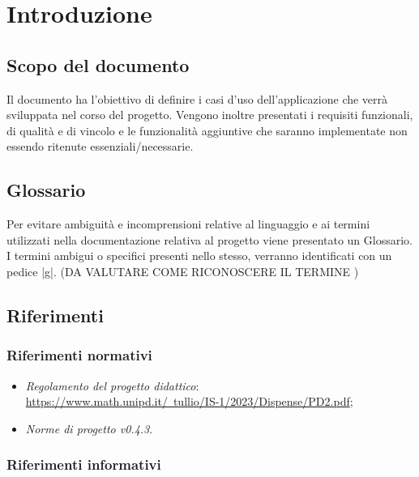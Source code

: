 \documentclass[10pt, a4paper]{article}
\title{\titolo}
\author{SWEetCode}
\begin{document}



\newpage

\tableofcontents
\newpage

\section{Introduzione}
\subsection{Scopo del documento}
Il documento ha l'obiettivo di definire i casi d'uso dell'applicazione che verrà sviluppata nel corso del progetto. Vengono inoltre presentati i requisiti funzionali, di qualità e di vincolo e le funzionalità aggiuntive che saranno implementate non essendo ritenute essenziali/necessarie.
\\
\subsection{Glossario}
Per evitare ambiguità e incomprensioni relative al linguaggio e ai termini utilizzati nella documentazione relativa al progetto viene presentato un Glossario.
I termini ambigui o specifici presenti nello stesso, verranno identificati con un pedice |g|. (DA VALUTARE COME RICONOSCERE IL TERMINE )
\\
\subsection{Riferimenti}
   \subsubsection{Riferimenti normativi}
   \begin{itemize}
    \item \textit{Regolamento del progetto didattico}: \\
    \href{https://www.math.unipd.it/~tullio/IS-1/2023/Dispense/PD2.pdf}{https://www.math.unipd.it/~tullio/IS-1/2023/Dispense/PD2.pdf};
    \item \textit{Norme di progetto v0.4.3}.
    \end{itemize}
    
    \subsubsection{Riferimenti informativi}
    
\end{document}

